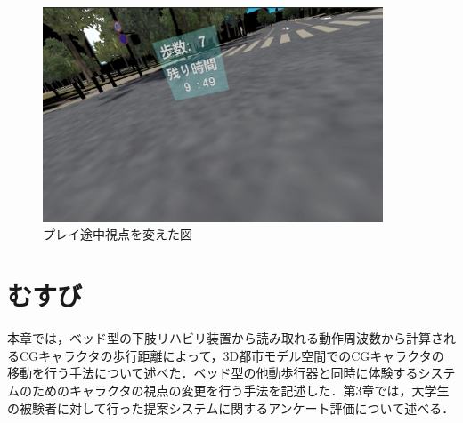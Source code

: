 \begin{figure}[tbp]
	\centering
			\includegraphics[width=0.9\textwidth]{chap2-figure/midstream-2.eps}
	\caption{プレイ途中視点を変えた図}
	\label{fig:geammidstream}
\end{figure}
\fi

\section{むすび}

本章では，ベッド型の下肢リハビリ装置から読み取れる動作周波数から計算されるCGキャラクタの歩行距離によって，3D都市モデル空間でのCGキャラクタの移動を行う手法について述べた．ベッド型の他動歩行器と同時に体験するシステムのためのキャラクタの視点の変更を行う手法を記述した．第3章では，大学生の被験者に対して行った提案システムに関するアンケート評価について述べる．
\fi

